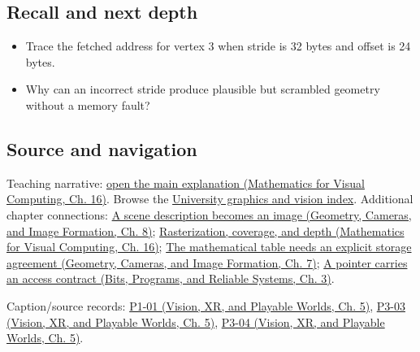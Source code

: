 \subsection{Recall and next depth}\label{appendix-749ba51a6c25-recall-and-next-depth}

\hypertarget{appendix-749ba51a6c25-recall-and-next-depth}{}

\begin{itemize}
\tightlist
\item
  Trace the fetched address for vertex 3 when stride is 32 bytes and offset is 24 bytes.
\item
  Why can an incorrect stride produce plausible but scrambled geometry without a memory fault?
\end{itemize}

\subsection{Source and navigation}\label{appendix-749ba51a6c25-source-and-navigation}

\hypertarget{appendix-749ba51a6c25-source-and-navigation}{}

Teaching narrative: \href{../02-Mathematics-for-Visual-Computing/main.pdf\#nameddest=03-visual-computing-i-ch012-rasterization-coverage-and-depth}{open the main explanation (Mathematics for Visual Computing, Ch. 16)}. Browse the \hyperref[appendix-a6d556a4ef50-university-graphics-vision-and-photography---independent-series]{University graphics and vision index}. Additional chapter connections: \href{../03-Geometry-Cameras-and-Image-Formation/main.pdf\#nameddest=03-visual-computing-i-ch001-a-scene-description-becomes-an-image}{A scene description becomes an image (Geometry, Cameras, and Image Formation, Ch. 8)}; \href{../02-Mathematics-for-Visual-Computing/main.pdf\#nameddest=03-visual-computing-i-ch012-rasterization-coverage-and-depth}{Rasterization, coverage, and depth (Mathematics for Visual Computing, Ch. 16)}; \href{../03-Geometry-Cameras-and-Image-Formation/main.pdf\#nameddest=02-foundations-ii-ch038-the-mathematical-table-needs-an-explicit-storage-agreement}{The mathematical table needs an explicit storage agreement (Geometry, Cameras, and Image Formation, Ch. 7)}; \href{../01-Bits-Programs-and-Reliable-Systems/main.pdf\#nameddest=01-foundations-i-ch003-a-pointer-carries-an-access-contract}{A pointer carries an access contract (Bits, Programs, and Reliable Systems, Ch. 3)}.

Caption/source records: \href{../07-Vision-XR-and-Playable-Worlds/main.pdf\#nameddest=04-visual-computing-ii-ch036-p1-01---module-1.1-course-intro-administrivia-part-1-graphics-visual-computing-2026}{P1-01 (Vision, XR, and Playable Worlds, Ch. 5)}, \href{../07-Vision-XR-and-Playable-Worlds/main.pdf\#nameddest=04-visual-computing-ii-ch036-p3-03---moving-objects-in-space}{P3-03 (Vision, XR, and Playable Worlds, Ch. 5)}, \href{../07-Vision-XR-and-Playable-Worlds/main.pdf\#nameddest=04-visual-computing-ii-ch036-p3-04---rotations-about-an-arbitrary-axis}{P3-04 (Vision, XR, and Playable Worlds, Ch. 5)}.
